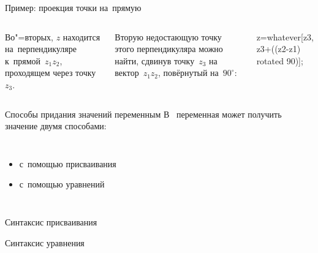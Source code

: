\begin{frame}{Пример: проекция точки на~прямую}
\begin{columns}
\centering
{}
Во"=вторых, $z$ находится на~перпендикуляре к~прямой~$z_1z_2$, проходящем через
точку~$z_3$.

\bigskip

Вторую недостающую точку этого перпендикуляра можно найти, сдвинув точку~$z_3$
на вектор~$z_1z_2$, повёрнутый на~$90^\circ$:
\begin{programlisting}
z=whatever[z3, z3+((z2-z1) rotated 90)];
\end{programlisting}
\end{columns}
\end{frame}


\begin{frame}{Способы придания значений переменным}
В~ переменная может получить значение двумя способами:
\begin{columns}
\begin{itemize}
\item
с~помощью \alert<2>{присваивания}
\item
с~помощью \alert<3>{уравнений}
\end{itemize}
\begin{center}
\LARGE{}%
\end{center}
\end{columns}
\end{frame}


\begin{frame}{Синтаксис присваивания}
\centering
\LARGE
{}\literal{:=}\literal{;}
\end{frame}


\begin{frame}{Синтаксис уравнения}
%
%
\end{frame}

